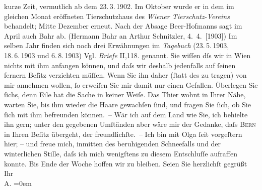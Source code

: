 \begin{ledgroupsized}[t]{13cm}
{{{{                     kurze Zeit, vermutlich ab dem 23. 3. 1902. Im Oktober wurde er in dem im gleichen
                     Monat eröffneten Tierschutzhaus des \emph{Wiener Tierschutz-Vereins} behandelt;
                        Mitte Dezember erneut. Nach der Absage Beer-Hofmanns sagt im April auch Bahr ab. (Hermann Bahr an Arthur Schnitzler, 4. 4. [1903]) Im selben Jahr finden sich noch drei Erwähnungen im \emph{Tagebuch} (23. 5. 1903, 18. 6. 1903 und 6. 8. 1903) Vgl. \emph{Briefe} II,118.}}}\label{K_L01265-1h}} genannt. Sie wiſſen dſs wir
               in Wien nichts mit ihm anfangen können, und daſs wir
               deshalb jedenfalls auf ſeinen fernern Beſitz verzichten {\pb}müſſen. Wenn Sie ihn daher (ſtatt des \label{K_L01265_1v}\label{K_L01265_1h} zu tragen) von mir annehmen wollen, ſo erweiſen Sie
               mir damit nur einen Gefallen. Überlegen Sie ſichs, denn Eile hat die Sache in keiner
               Weiſe. Das Thier wohnt in Ihrer Nähe, warten Sie, bis ihm wieder {\pb}die Haare gewachſen ſind, und fragen Sie ſich, ob Sie
               ſich mit ihm befreunden können. – Wär ich auf dem Land wie Sie, ich behielte ihn
               gern; unter den gegebenen Umſtänden aber wäre mir der Gedanke, daſs \textsc{Bern} in Ihren Beſitz übergeht, der freundlichſte. –\pend
           \pstart
           {\pb}Ich bin mit Olga
               ſeit vorgeſtern hier; – und freue mich, inmitten des beruhigenden Schneefalls und der
               winterlichen Stille, daſs ich mich wenigſtens zu diesem Entschluſſe aufraffen konnte.
               Bis Ende der Woche hoffen wir zu bleiben.\pend
           \pstart
           Seien Sie herzlichſt gegrüßt\pend
           \pstart
           Ihr{\\[\baselineskip]}\spacefill\mbox{A.}\pend
           \leftskip=0em{}\endnumbering{}\end{ledgroupsized}  \newcommand{\dateiname}{L01265}\newcommand{\titel}{Arthur Schnitzler an Richard Beer-Hofmann, 14. 1. 1903}\newcommand{\editorInnen}{Martin Anton Müller und Gerd-Hermann Susen}
      